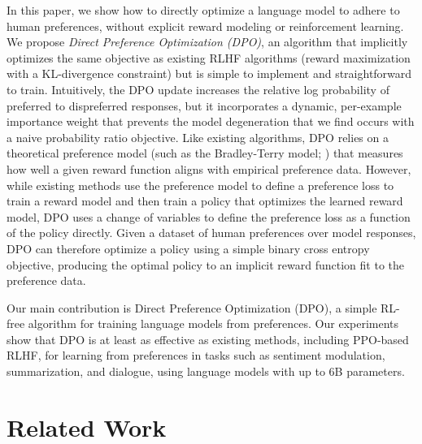 In this paper, we show how to directly optimize a language model to adhere to human preferences, without explicit reward modeling or reinforcement learning. We propose
\textit{{Direct Preference Optimization} (DPO)}, an algorithm that implicitly optimizes the same objective as existing RLHF algorithms (reward maximization with a KL-divergence constraint) but is simple to implement and straightforward to train. Intuitively, the DPO update increases the relative log probability of preferred to dispreferred responses, but it incorporates a dynamic, per-example importance weight that prevents the model degeneration that we find occurs with a naive probability ratio objective. Like existing algorithms, DPO relies on a theoretical preference model (such as the Bradley-Terry model; \cite{bradley1952rankanalysis}) that measures how well a given reward function aligns with empirical preference data. However, while existing methods use the preference model to define a preference loss to train a reward model and then train a policy that optimizes the learned reward model, DPO uses a change of variables to define the preference loss as a function of the policy directly. Given a dataset of human preferences over model responses, DPO can therefore optimize a policy using a simple binary cross entropy objective, producing the optimal policy to an implicit reward function fit to the preference data.

Our main contribution is Direct Preference Optimization (DPO), a simple RL-free algorithm for training language models from preferences. Our experiments show that DPO is at least as effective as existing methods, including PPO-based RLHF, for learning from preferences in tasks such as sentiment modulation, summarization, and dialogue, using language models with up to 6B parameters.

\section{Related Work}

